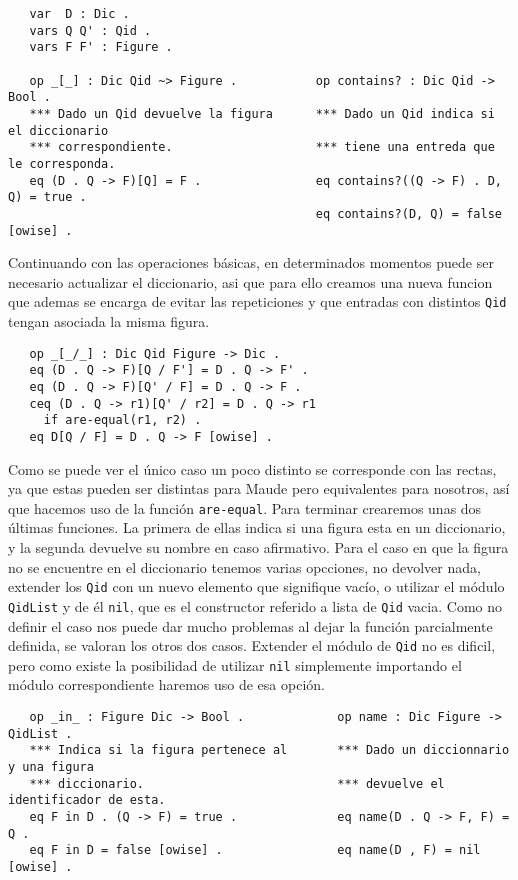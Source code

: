 {\codesize
\begin{verbatim}
   var  D : Dic .
   vars Q Q' : Qid .
   vars F F' : Figure .

   op _[_] : Dic Qid ~> Figure .           op contains? : Dic Qid -> Bool .
   *** Dado un Qid devuelve la figura      *** Dado un Qid indica si el diccionario
   *** correspondiente.                    *** tiene una entreda que le corresponda.
   eq (D . Q -> F)[Q] = F .                eq contains?((Q -> F) . D, Q) = true .
                                           eq contains?(D, Q) = false [owise] .

\end{verbatim}
}

Continuando con las operaciones básicas, en determinados momentos puede ser necesario actualizar el diccionario, asi que para ello creamos una nueva funcion que ademas se encarga de evitar las repeticiones y que entradas con distintos \texttt{Qid} tengan asociada la misma figura. \par

{\codesize
\begin{verbatim}
   op _[_/_] : Dic Qid Figure -> Dic .
   eq (D . Q -> F)[Q / F'] = D . Q -> F' .
   eq (D . Q -> F)[Q' / F] = D . Q -> F .
   ceq (D . Q -> r1)[Q' / r2] = D . Q -> r1
     if are-equal(r1, r2) .   
   eq D[Q / F] = D . Q -> F [owise] .
\end{verbatim}
}

Como se puede ver el único caso un poco distinto se corresponde con las rectas, ya que estas pueden ser distintas para Maude pero equivalentes para nosotros, así que hacemos uso de la función \verb"are-equal". Para terminar crearemos unas dos últimas funciones. La primera de ellas indica si una figura esta en un diccionario, y la segunda devuelve su nombre en caso afirmativo. Para el caso en que la figura no se encuentre en el diccionario tenemos varias opcciones, no devolver nada, extender los \texttt{Qid} con un nuevo elemento que signifique vacío, o utilizar el módulo \texttt{QidList} y de él \texttt{nil}, que es el constructor referido a lista de \texttt{Qid} vacia. Como no definir el caso nos puede dar mucho problemas al dejar la función parcialmente definida, se valoran los otros dos casos. Extender el módulo de \texttt{Qid} no es dificil, pero como existe la posibilidad de utilizar \texttt{nil} simplemente importando el módulo correspondiente haremos uso de esa opción. \par

{\codesize
\begin{verbatim}
   op _in_ : Figure Dic -> Bool .             op name : Dic Figure -> QidList .
   *** Indica si la figura pertenece al       *** Dado un diccionnario y una figura 
   *** diccionario.                           *** devuelve el identificador de esta.
   eq F in D . (Q -> F) = true .              eq name(D . Q -> F, F) = Q .
   eq F in D = false [owise] .                eq name(D , F) = nil [owise] . 
\end{verbatim}
}

